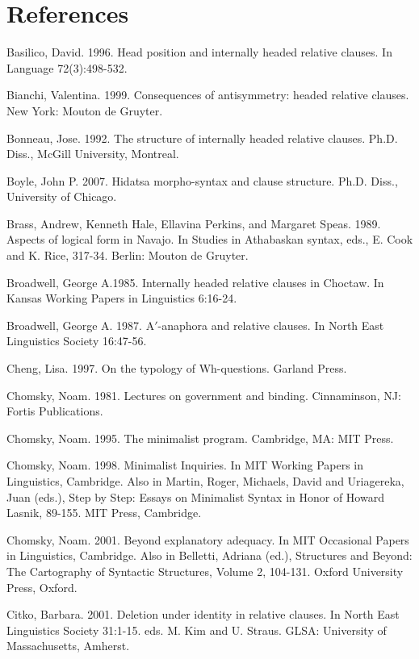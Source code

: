 \documentclass[output=paper]{LSP/langsci}
\begin{document}
\section*{References} 

\printbibliography 

\begin{reflist}
Basilico, David. 1996. Head position and internally headed relative clauses. In Language 72(3):498-532.

Bianchi, Valentina. 1999. Consequences of antisymmetry: headed relative clauses. New York: Mouton de Gruyter.

Bonneau, Jose. 1992. The structure of internally headed relative clauses.  Ph.D. Diss., McGill University, Montreal.

Boyle, John P. 2007. Hidatsa morpho-syntax and clause structure. Ph.D. Diss., University of Chicago.

Brass, Andrew, Kenneth Hale, Ellavina Perkins, and Margaret Speas. 1989. Aspects of logical form in Navajo. In Studies in Athabaskan syntax, eds., E. Cook and K. Rice, 317-34. Berlin: Mouton de Gruyter.

Broadwell, George A.1985. Internally headed relative clauses in Choctaw. In Kansas Working Papers in Linguistics 6:16-24.

Broadwell, George A. 1987. A$'$-anaphora and relative clauses. In North East Linguistics Society 16:47-56.

Cheng, Lisa. 1997. On the typology of Wh-questions. Garland Press.

Chomsky, Noam. 1981. Lectures on government and binding. Cinnaminson, NJ: Fortis Publications.

Chomsky, Noam. 1995. The minimalist program. Cambridge, MA: MIT Press.

Chomsky, Noam. 1998. Minimalist Inquiries. In MIT Working Papers in Linguistics, Cambridge. Also in Martin, Roger, Michaels, David and Uriagereka, Juan (eds.), Step by Step: Essays on Minimalist Syntax in Honor of Howard Lasnik, 89-155. MIT Press, Cambridge.  

Chomsky, Noam. 2001. Beyond explanatory adequacy. In MIT Occasional Papers in Linguistics, Cambridge. Also in Belletti, Adriana (ed.), Structures and Beyond: The Cartography of Syntactic Structures, Volume 2, 104-131. Oxford University Press, Oxford.

Citko, Barbara. 2001. Deletion under identity in relative clauses. In North East Linguistics Society 31:1-15. eds. M. Kim and U. Straus. GLSA: University of Massachusetts, Amherst.


\end{reflist}
\end{document}
